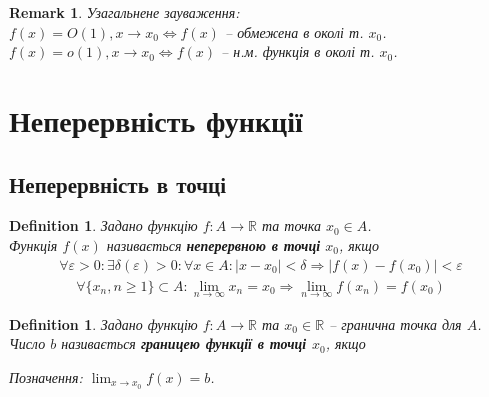 \documentclass[a4paper, 14pt]{article}
\theoremstyle{theoremdd}
\theoremstyle{theoremdd}
\newtheorem{definition}[theorem]{Definition}
\theoremstyle{theoremdd}
\theoremstyle{theoremdd}
\theoremstyle{theoremdd}
\theoremstyle{theoremdd}
\newtheorem{remark}[theorem]{Remark}
\theoremstyle{theoremdd}
\theoremstyle{theoremdd}
\begin{document}
\begin{remark}
Узагальнене зауваження:\\
$f(x) = O(1), x \to x_0 \iff f(x)$ -- обмежена в околі т. $x_0$.\\
$f(x) = o(1), x \to x_0 \iff f(x)$ -- н.м. функція в околі т. $x_0$.
\\ \iffalse %
\begin{figure} [H]
\centering
\begin{tikzpicture}
\draw[thick, ->] (-4,0)--(4.2,0) node[anchor = north] {$x$};
\draw[thick, ->] (0,-4)--(0,4.2) node[anchor = east] {$y$};


\draw[thick, domain=-4:4, variable=\x, samples = 1000] plot({\x}, {sin(deg(\x))}) node[anchor = north west, scale = 0.7] {$f(x) = \sin x$};
\draw[thick, domain=-4:4, variable=\x, samples = 1000] plot({\x}, {\x}) node[anchor = south west, scale = 0.7] {$g(x) = x$};
\end{tikzpicture}
\caption*{В околі т. $x_0 = 0$ функція $\sin x$ дуже схожа на $x$, тобто однакова поведінка}
\end{figure}
\fi %
\end{remark}
\newpage

\section{Неперервність функції}
\subsection{Неперервність в точці}
\begin{definition}
Задано функцію $f \colon A \to \mathbb{R}$ та точка $x_0 \in A$.\\
Функція $f(x)$ називається \textbf{неперервною в точці} $x_0$, якщо
	\begin{align*}
	\forall \varepsilon > 0: \exists \delta(\varepsilon) > 0: \forall x \in A: |x-x_0|<\delta \Rightarrow |f(x)-f(x_0)|<\varepsilon \tag*{означення Коші}
	\end{align*}
	\begin{align*}
	\forall \{x_n, n \geq 1\}\subset A: \lim_{n \to \infty} x_n = x_0 \Rightarrow \lim_{n \to \infty} f(x_n) = f(x_0) \tag*{означення Гайне}
	\end{align*}
\end{definition}

	\begin{definition}
	Задано функцію $f \colon A \to \mathbb{R}$ та $x_0 \in \mathbb{R}$ -- гранична точка для $A$.\\
	Число $b$ називається \textbf{границею функції в точці $x_0$}, якщо

	Позначення: $\displaystyle \lim_{x \to x_0} f(x) = b$.
	\end{definition}
\end{document}
